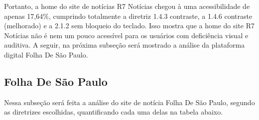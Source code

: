 \documentclass[a4paper]{article}
\begin{document}
\begin{titlepage}
Portanto, a home do site de notícias R7 Notícias chegou à uma acessibilidade de apenas 17,64\%, cumprindo totalmente a diretriz 1.4.3 contraste, a 1.4.6 contraste (melhorado) e a 2.1.2 sem bloqueio do teclado. Isso mostra que a home do site R7 Notícias não é nem um pouco acessível para os usuários com deficiência visual e auditiva. A seguir, na próxima subseção será mostrado a análise da plataforma digital Folha De São Paulo.

\subsection{Folha De São Paulo}

Nessa subseção será feita a análise do site de notícia Folha De São Paulo, segundo as diretrizes escolhidas, quantificando cada uma delas na tabela abaixo.\\


\end{titlepage}
\end{document}

